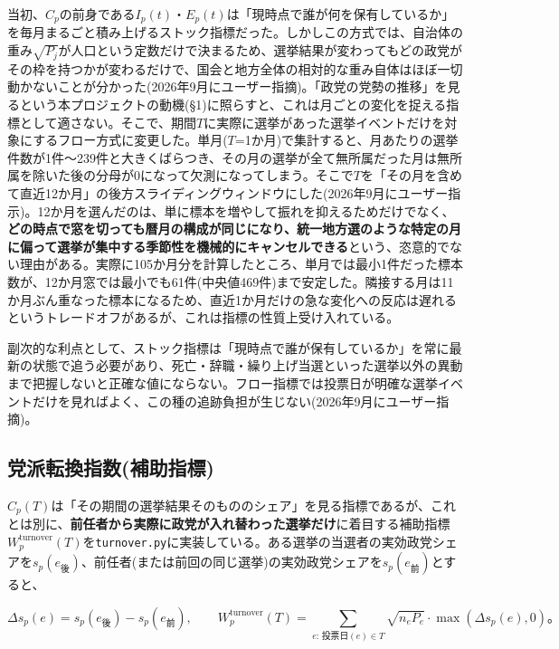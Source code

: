 \documentclass[a4paper,11pt]{ltjsarticle}
\begin{document}
\begin{description}[leftmargin=1em,style=nextline]
  \item[ストック指標からフロー指標に変更した。] 当初、$C_p$の前身である$I_p(t)$・$E_p(t)$は「現時点で誰が何を保有しているか」を毎月まるごと積み上げるストック指標だった。しかしこの方式では、自治体の重み$\sqrt{P_j}$が人口という定数だけで決まるため、選挙結果が変わってもどの政党がその枠を持つかが変わるだけで、国会と地方全体の相対的な重み自体はほぼ一切動かないことが分かった(2026年9月にユーザー指摘)。「政党の党勢の推移」を見るという本プロジェクトの動機(\S1)に照らすと、これは月ごとの変化を捉える指標として適さない。そこで、期間$T$に実際に選挙があった選挙イベントだけを対象にするフロー方式に変更した。単月($T$=1か月)で集計すると、月あたりの選挙件数が1件〜239件と大きくばらつき、その月の選挙が全て無所属だった月は無所属を除いた後の分母が0になって欠測になってしまう。そこで$T$を「その月を含めて直近12か月」の後方スライディングウィンドウにした(2026年9月にユーザー指示)。12か月を選んだのは、単に標本を増やして振れを抑えるためだけでなく、\textbf{どの時点で窓を切っても暦月の構成が同じになり、統一地方選のような特定の月に偏って選挙が集中する季節性を機械的にキャンセルできる}という、恣意的でない理由がある。実際に105か月分を計算したところ、単月では最小1件だった標本数が、12か月窓では最小でも61件(中央値469件)まで安定した。隣接する月は11か月ぶん重なった標本になるため、直近1か月だけの急な変化への反応は遅れるというトレードオフがあるが、これは指標の性質上受け入れている。

  副次的な利点として、ストック指標は「現時点で誰が保有しているか」を常に最新の状態で追う必要があり、死亡・辞職・繰り上げ当選といった選挙以外の異動まで把握しないと正確な値にならない。フロー指標では投票日が明確な選挙イベントだけを見ればよく、この種の追跡負担が生じない(2026年9月にユーザー指摘)。
\end{description}

\subsection{党派転換指数(補助指標)}
\label{sec:turnover-index}

$C_p(T)$は「その期間の選挙結果そのもののシェア」を見る指標であるが、これとは別に、\textbf{前任者から実際に政党が入れ替わった選挙だけ}に着目する補助指標$W_p^{\text{turnover}}(T)$を\texttt{turnover.py}に実装している。ある選挙の当選者の実効政党シェアを$s_p(e_{後})$、前任者(または前回の同じ選挙)の実効政党シェアを$s_p(e_{前})$とすると、

\[
\Delta s_p(e) = s_p(e_{後}) - s_p(e_{前}), \qquad
W_p^{\text{turnover}}(T) = \sum_{e:\,投票日(e)\in T} \sqrt{n_eP_e} \cdot \max(\Delta s_p(e), 0)。
\]
\end{document}
